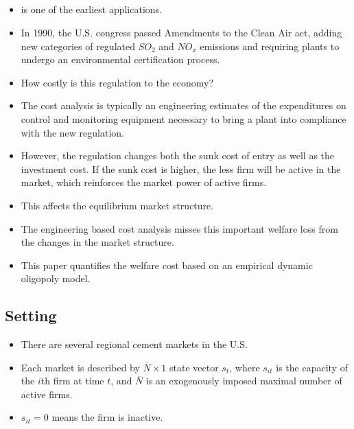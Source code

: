 \documentclass[]{book}
\providecommand{\tightlist}{%
  \setlength{\itemsep}{0pt}\setlength{\parskip}{0pt}}
\begin{document}
\subsection{\texorpdfstring{\citet{ryanCostEnvironmentRegulation2012}}{@ryanCostEnvironmentRegulation2012}}\label{ryancostenvironmentregulation2012}

\begin{itemize}
\tightlist
\item
  \citet{ryanCostEnvironmentRegulation2012} is one of the earliest
  applications.
\item
  In 1990, the U.S. congress passed Amendments to the Clean Air act,
  adding new categories of regulated \(SO_2\) and \(NO_x\) emissions and
  requiring plants to undergo an environmental certification process.
\item
  How costly is this regulation to the economy?
\item
  The cost analysis is typically an engineering estimates of the
  expenditures on control and monitoring equipment necessary to bring a
  plant into compliance with the new regulation.
\item
  However, the regulation changes both the sunk cost of entry as well as
  the investment cost. If the sunk cost is higher, the less firm will be
  active in the market, which reinforces the market power of active
  firms.
\item
  This affects the equilibrium market structure.
\item
  The engineering based cost analysis misses this important welfare loss
  from the changes in the market structure.
\item
  This paper quantifies the welfare cost based on an empirical dynamic
  oligopoly model.
\end{itemize}

\subsection{Setting}\label{setting-2}

\begin{itemize}
\tightlist
\item
  There are several regional cement markets in the U.S.
\item
  Each market is described by \(\overline{N} \times 1\) state vector
  \(s_t\), where \(s_{it}\) is the capacity of the \(i\)th firm at time
  \(t\), and \(\overline{N}\) is an exogenously imposed maximal number
  of active firms.
\item
  \(s_{it} = 0\) means the firm is inactive.
\end{itemize}
\end{document}
